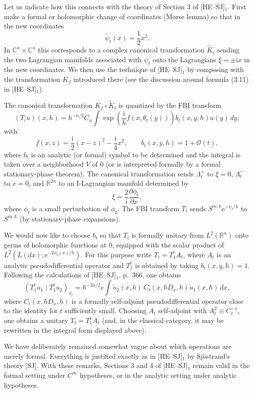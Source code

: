 \documentclass[11pt]{article}
\newcommand{\R}{\mathbb{R}}
\newcommand{\C}{\mathbb{C}}
\newcommand{\OO}{\mathcal O}
\newcommand{\dd}{\,d}
\newcommand{\ii}{\mathrm{i}}
\newcommand{\e}{\mathrm{e}}
\begin{document}
Let us indicate how this connects with the theory of Section 3 of [HE--SJ]$_1$. First make a formal or holomorphic change of coordinates (Morse lemma) so that in the new coordinates
\[
\widetilde\psi_t(x)=\frac12x^2.
\]
In $\C^n\times\C^n$ this corresponds to a complex canonical transformation $\widetilde K_t$ sending the two Lagrangian manifolds associated with $\psi_t$ onto the Lagrangians $\xi=\pm\ii x$ in the new coordinates. We then use the technique of [HE--SJ]$_1$ by composing with the transformation $K_f$ introduced there (see the discussion around formula (3.11) in [HE--SJ]$_1$).

The canonical transformation $K_f\circ\widetilde K_t$ is quantized by the FBI transform
\[
(T_tu)(x,h)=h^{-n/2}C_n\int
\exp\!\left(\frac{\ii}{h}f(x,\theta_t(y))\right)b_t(x,y,h)u(y)\dd y,
\]
with
\[
f(x,z)=\frac{\ii}{2}(x-z)^2-\frac{\ii}{4}x^2,
\qquad
b_t(x,y,h)=1+\OO(t),
\]
where $b_t$ is an analytic (or formal) symbol to be determined and the integral is taken over a neighborhood $V$ of $0$ (or is interpreted formally by a formal stationary-phase theorem).
The canonical transformation sends $\Lambda_t^+$ to $\xi=0$, $\Lambda_t^-$ to $x=0$, and $\R^{2n}$ to an I-Lagrangian manifold determined by
\[
\xi=\frac{2}{\ii}\frac{\partial\phi_t}{\partial x},
\]
where $\phi_t$ is a small perturbation of $\phi_0$.
The FBI transform $T_t$ sends $S^{m,k}\e^{-\psi_t/h}$ to $S^{m,k}$ (by stationary-phase expansions).

We would now like to choose $b_t$ so that $T_t$ is formally unitary from $L^2(\R^n)$ onto germs of holomorphic functions at $0$, equipped with the scalar product of
$L^2(L(dx);\e^{-2\phi_t(x)/h})$.
For this purpose write $T_t=T_1^tA_t$, where $A_t$ is an analytic pseudodifferential operator and $T_1^t$ is obtained by taking $b_t(x,y,h)=1$.
Following the calculations of [HE--SJ]$_1$, p.~366, one obtains
\[
(T_1^tu_1\mid T_1^tu_2)_{\phi_t}
=h^{-3n/2}c\int
\overline{\widetilde u_2(\overline x,h)}\,
C_t(x,hD_x,h)\widetilde u_1(x,h)\dd x,
\]
where $C_t(x,hD_x,h)$ is a formally self-adjoint pseudodifferential operator close to the identity for $t$ sufficiently small.
Choosing $A_t$ self-adjoint with $A_t^2\equiv C_t^{-1}$, one obtains a unitary $T_t=T_1^tA_t$ (and, in the classical category, it may be rewritten in the integral form displayed above).

We have deliberately remained somewhat vague about which operations are merely formal. Everything is justified exactly as in [HE--SJ]$_1$ by Sjöstrand's theory [SJ]. With these remarks, Sections 3 and 4 of [HE--SJ]$_1$ remain valid in the formal setting under $C^\infty$ hypotheses, or in the analytic setting under analytic hypotheses.
\end{document}
